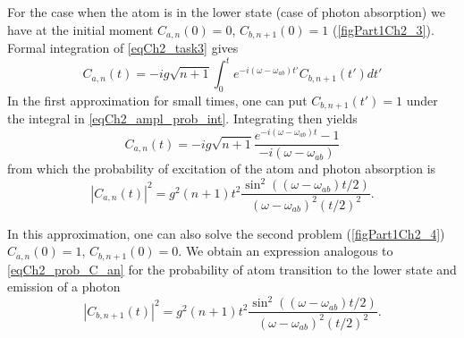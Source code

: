 

For the case when the atom is in the lower state (case of photon absorption) we have at the initial moment  
$C_{a, n}\left(0\right) = 0$, $C_{b, n + 1}\left(0\right) = 1$
(\autoref{figPart1Ch2_3}). Formal integration of \eqref{eqCh2_task3} gives  
\begin{equation}
C_{a,n}\left(t\right) = -i g \sqrt{n + 1}
\int_0^t e^{-i \left(\omega - \omega_{ab}\right)t'} 
C_{b, n + 1}\left(t'\right) dt'
\label{eqCh2_ampl_prob_int}
\end{equation}
In the first approximation for small times, one can put
$C_{b, n + 1}\left(t'\right) = 1$ under the integral in \eqref{eqCh2_ampl_prob_int}. Integrating then yields  
\begin{equation}
C_{a,n}\left(t\right) = -i g \sqrt{n + 1}
\frac{e^{-i \left(\omega - \omega_{ab}\right)t} - 1}
{-i \left(\omega - \omega_{ab}\right)}
\end{equation}
from which the probability of excitation of the atom and photon absorption is 
\begin{equation}
\left|C_{a,n}\left(t\right)\right|^2 = g^2 \left(n + 1\right) t^2
\frac{\sin^2\left(\left(\omega - \omega_{ab}\right)t/2\right)}
{\left(\omega - \omega_{ab}\right)^2\left(t/2\right)^2}. 
\label{eqCh2_prob_C_an}
\end{equation}



In this approximation, one can also solve the second problem (\autoref{figPart1Ch2_4}) 
$C_{a, n}\left(0\right) = 1$, $C_{b, n + 1}\left(0\right) = 0$. 
We obtain an expression analogous to \eqref{eqCh2_prob_C_an} for the probability of atom transition to the lower state and emission of a photon  
\begin{equation}
\left|C_{b, n + 1}\left(t\right)\right|^2 = g^2 \left(n + 1\right) t^2
\frac{\sin^2\left(\left(\omega - \omega_{ab}\right)t/2\right)}
{\left(\omega - \omega_{ab}\right)^2\left(t/2\right)^2}.
\label{eqCh2_prob_C_bn}
\end{equation}

